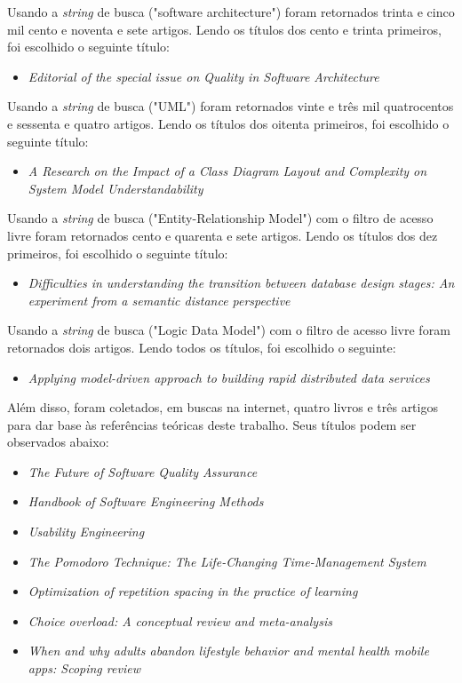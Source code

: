 Usando a \textit{string} de busca ("software architecture") foram retornados trinta e cinco mil cento e noventa e sete artigos.
Lendo os títulos dos cento e trinta primeiros, foi escolhido o seguinte título:

\begin{itemize}
    \item \textit{Editorial of the special issue on Quality in Software Architecture}
\end{itemize}

Usando a \textit{string} de busca ("UML") foram retornados vinte e três mil quatrocentos e sessenta e quatro artigos.
Lendo os títulos dos oitenta primeiros, foi escolhido o seguinte título:

\begin{itemize}
    \item \textit{A Research on the Impact of a Class Diagram Layout and Complexity on System Model Understandability}
\end{itemize}

Usando a \textit{string} de busca ("Entity-Relationship Model") com o filtro de acesso livre foram retornados cento e quarenta e sete artigos.
Lendo os títulos dos dez primeiros, foi escolhido o seguinte título:

\begin{itemize}
    \item \textit{Difficulties in understanding the transition between database design stages: An experiment from a semantic distance perspective}
\end{itemize}

Usando a \textit{string} de busca ("Logic Data Model") com o filtro de acesso livre foram retornados dois artigos.
Lendo todos os títulos, foi escolhido o seguinte:

\begin{itemize}
    \item \textit{Applying model-driven approach to building rapid distributed data services}
\end{itemize}

Além disso, foram coletados, em buscas na internet, quatro livros e três artigos para dar base às referências teóricas deste trabalho.
Seus títulos podem ser observados abaixo:

\begin{itemize}
    \item \textit{The Future of Software Quality Assurance}
    \item \textit{Handbook of Software Engineering Methods}
    \item \textit{Usability Engineering}
    \item \textit{The Pomodoro Technique: The Life-Changing Time-Management System}
    \item \textit{Optimization of repetition spacing in the practice of learning}
    \item \textit{Choice overload: A conceptual review and meta-analysis}
    \item \textit{When and why adults abandon lifestyle behavior and mental health mobile apps: Scoping review}
\end{itemize}

